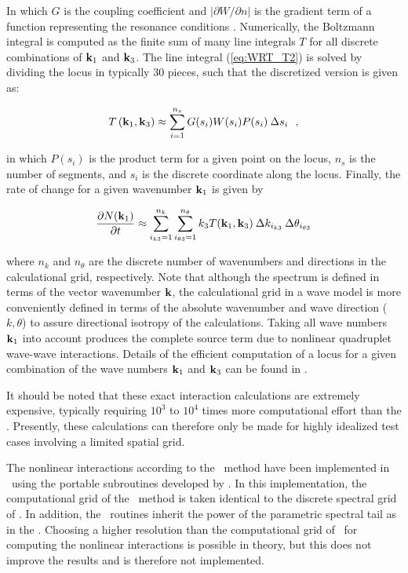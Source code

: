 \noindent
In which $G$ is the coupling coefficient and $\left| {\partial W/\partial n}
\right|$ is the gradient term of a function representing the resonance
conditions \citep[see][]{pro:vVl00}. Numerically, the Boltzmann integral is
computed as the finite sum of many line integrals $T$ for all discrete
combinations of $\mbox{\bf k}_1$ and $\mbox{\bf k}_3$. The line integral (\ref{eq:WRT_T2}) is
solved by dividing the locus in typically 30 pieces, such that the discretized
version is given as:

\begin{equation}
T\left( {\mbox{\bf k}_1 ,\mbox{\bf k}_3 } \right) \approx \sum_{i=1}^{n_s } G(s_i)
W(s_i) P(s_i) \: \Delta s_i \:\:\: ,
\end{equation}

\noindent
in which $P(s_i)$ is the product term for a given point on the locus,
$n_s$ is the number of segments, and $s_i$ is the discrete coordinate
along the locus. Finally, the rate of change for a given wavenumber
$\mbox{\bf k}_1 $ is given by

\begin{equation}
\frac{\partial N(\mbox{\bf k}_1)}{\partial t} \approx \sum_{i_{k3}  = 1}^{n_k }
{\sum_{i_{\theta 3}  = 1}^{n_\theta  } k_3 T(\mbox{\bf k}_1,\mbox{\bf k}_3) \: \Delta
k_{i_{k3}} \: \Delta \theta_{i_{\theta 3} } } \label{eq:WRT_numT}
\end{equation}

\noindent
where $n_k$ and $n_\theta$ are the discrete number of wavenumbers and
directions in the calculational grid, respectively. Note that although the
spectrum is defined in terms of the vector wavenumber $\mbox{\bf k}$, the calculational
grid in a wave model is more conveniently defined in terms of the absolute
wavenumber and wave direction ($k,\theta$) to assure directional isotropy of
the calculations. Taking all wave numbers $\mbox{\bf k}_1 $ into account produces the
complete source term due to nonlinear quadruplet wave-wave
interactions. Details of the efficient computation of a locus for a given
combination of the wave numbers $\mbox{\bf k}_1 $ and $\mbox{\bf k}_3 $ can be found in
\cite{pro:vVl00,rep:vVl02a,rep:vVl02b}.

It should be noted that these exact interaction calculations are extremely
expensive, typically requiring $10^3$ to $10^4$ times more computational
effort than the \dia. Presently, these calculations can therefore only be made
for highly idealized test cases involving a limited spatial grid.

The nonlinear interactions according to the \xnl\ method have been implemented
in \ws\ using the portable subroutines developed by \cite{rep:vVl02b}.  In
this implementation, the computational grid of the \xnl\ method is taken
identical to the discrete spectral grid of \ws.  In addition, the \xnl\
routines inherit the power of the parametric spectral tail as in the
\dia. Choosing a higher resolution than the computational grid of \ws\ for
computing the nonlinear interactions is possible in theory, but this does not
improve the results and is therefore not implemented.

